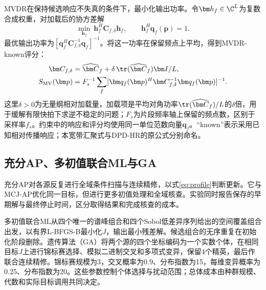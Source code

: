 MVDR在保持候选响应不失真的条件下，最小化输出功率\cite{Capon1969}。令$\bm h_f\in\C^L$为复数合成权重，对加载后的协方差解
\begin{equation}
 \min_{\bm h_f}\ \bm h_f^H\bm C_{f,\delta}\bm h_f,
 \qquad \bm h_f^H\bm q_f(\bm p)=1.\label{eq:mvdrConstraint}
\end{equation}
最优输出功率为$[\bm q_f^H\bm C_{f,\delta}^{-1}\bm q_f]^{-1}$。将这一功率在保留频点上平均，得到MVDR-known评分：
\begin{align}
 \bm C_{f,\delta}&=\widehat{\bm C}_f+
 \delta\,\tr(\widehat{\bm C}_f)\bm I/L,\nonumber\\
 S_{\mathrm{MV}}(\bm p)&=F_s^{-1}\sum_f
 [\bm q_f(\bm p)^H\bm C_{f,\delta}^{-1}\bm q_f(\bm p)]^{-1} .\label{eq:mvdr}
\end{align}
这里$\delta>0$为无量纲相对加载量，加载项是平均对角功率$\tr(\widehat{\bm C}_f)/L$的$\delta$倍，用于缓解有限快拍下求逆不稳定的问题；$F_s$为片段频率轴上保留的频点数，区别于采样率$f_s$。约束中的响应和评分均使用同一单位范数向量$\bm q_f$。“known”表示采用已知相对传播响应；本宽带汇聚式与DPD-HR的原公式分别命名\cite{TirerWeiss2016}。

\subsection{充分AP、多初值联合ML与GA}
充分AP对各源反复进行全域条件扫描与连续精修，以式\eqref{eq:profile}判断更新\cite{ChenHudsonYao2002}。它与MCJ-AP优化同一目标，但进行更多初值处理和全域核查。实验同时报告保存的早期解与最终停止时间，区分取得结果和完成核查的成本。

多初值联合ML从四个唯一的谱峰组合和四个Sobol低差异序列给出的空间覆盖组合出发，以有界L-BFGS-B最小化$J$，输出最小残差解。候选组合的无序重复在初始化阶段删除。遗传算法（GA）将两个源的四个坐标编码为一个实数个体，在相同目标$J$上进行锦标赛选择、模拟二进制交叉和多项式变异\cite{DebAgrawal1995}，保留4个精英，最后作联合连续精修。锦标赛规模为3，交叉概率为0.9、分布指数为15，每维变异概率为0.25、分布指数为20。这些参数控制个体选择与扰动范围；总体成本由种群规模、代数和实际目标调用共同决定。

